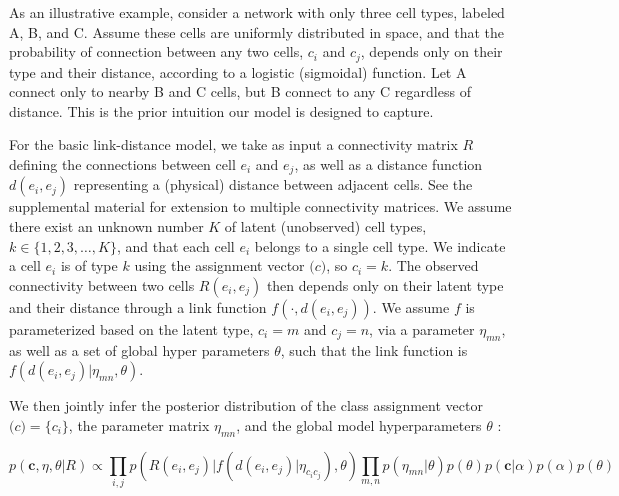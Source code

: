\documentclass{article}
\renewcommand{\vec}[1]{\mathbf{#1}}
\begin{document}
As an illustrative example, consider a network with only three cell
types, labeled A, B, and C. Assume these cells are uniformly
distributed in space, and that the probability of connection between
any two cells, $c_i$ and $c_j$, depends only on their type and their
distance, according to a logistic (sigmoidal) function. Let A connect
only to nearby B and C cells, but B connect to any C regardless of
distance. This is the prior intuition our model is designed to capture. 


For the basic link-distance model, we take as input a connectivity
matrix $R$ defining the connections between cell $e_i$ and $e_j$, as
well as a distance function $d(e_i, e_j)$ representing a (physical)
distance between adjacent cells.  See
the supplemental material for extension to multiple connectivity
matrices. We assume there exist an unknown number $K$ of latent
(unobserved) cell types, $k \in \{1, 2, 3, \dots, K\}$, and that each
cell $e_i$ belongs to a single cell type. We indicate a cell $e_i$ is
of type $k$ using the assignment vector $\vec(c)$, so $c_i = k$. The
observed connectivity between two cells $R(e_i, e_j)$ then depends
only on their latent type and their distance through a link function
$f(\cdot, d(e_i, e_j))$. We assume $f$ is parameterized based on the
latent type, $c_i=m$ and $c_j=n$, via a parameter $\eta_{mn}$, as well
as a set of global hyper parameters $\theta$, such that the link
function is $f(d(e_i, e_j) | \eta_{mn}, \theta)$.

We then jointly infer the posterior distribution of the
class assignment vector $\vec(c) = \{c_i\}$, the parameter matrix
$\eta_{mn}$, and the global model hyperparameters $\theta$ :

\begin{equation}
  p(\vec{c}, \eta, \theta | R ) \propto \prod_{i, j} p(R(e_i, e_j) | f(d(e_i, e_j) | \eta_{c_ic_j}), \theta) \prod_{m, n} p(\eta_{mn} | \theta)  p(\theta) p(\vec{c} | \alpha) p(\alpha) p(\theta)
\end{equation}
\end{document}
